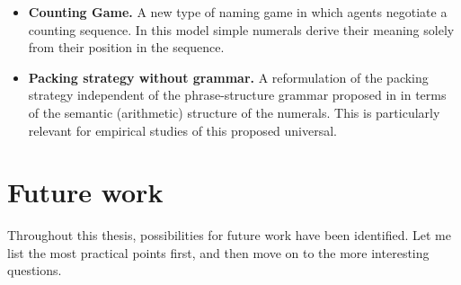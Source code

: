 \documentclass{../src/bcthesispart}
\begin{document}
\begin{itemize}
	\item \textbf{Counting Game.}
		A new type of naming game in which agents negotiate a counting sequence.
		In this model simple numerals derive their meaning solely from their position in the sequence.
		
	\item \textbf{Packing strategy without grammar.}
		A reformulation of the packing strategy independent of the phrase-structure grammar proposed in \textcite{Hurford1975} in terms of the semantic (arithmetic) structure of the numerals.
		This is particularly relevant for empirical studies of this proposed universal.
\end{itemize}



\section{Future work}

Throughout this thesis, possibilities for future work have been identified.
Let me list the most practical points first, and then move on to the more interesting questions.
\end{document}
